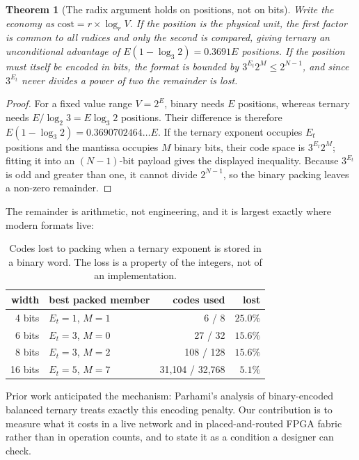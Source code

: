 \documentclass[11pt]{article}
\newtheorem{theorem}{Theorem}
\theoremstyle{definition}
\begin{document}
\begin{theorem}[The radix argument holds on positions, not on bits]
\label{thm:boundary}
Write the economy as $\text{cost} = r \times \log_r V$. If the position is the
physical unit, the first factor is common to all radices and only the second is
compared, giving ternary an unconditional advantage of $E(1-\log_3 2) = 0.3691E$
positions. If the position must itself be encoded in bits, the format is bounded
by $3^{E_t} 2^{M} \le 2^{N-1}$, and since $3^{E_t}$ never divides a power of two
the remainder is lost.
\end{theorem}
\begin{proof}
For a fixed value range $V=2^E$, binary needs $E$ positions, whereas ternary
needs $E/\log_2 3=E\log_3 2$ positions. Their difference is therefore
$E(1-\log_3 2)=0.3690702464\ldots E$. If the ternary exponent occupies
$E_t$ positions and the mantissa occupies $M$ binary bits, their code space is
$3^{E_t}2^M$; fitting it into an $(N-1)$-bit payload gives the displayed
inequality. Because $3^{E_t}$ is odd and greater than one, it cannot divide
$2^{N-1}$, so the binary packing leaves a non-zero remainder.
\end{proof}

The remainder is arithmetic, not engineering, and it is largest exactly where
modern formats live:

\begin{table}[t]\centering
\caption{Codes lost to packing when a ternary exponent is stored in a binary
word. The loss is a property of the integers, not of an implementation.}
\label{tab:packloss}
\begin{tabular}{rlrr}
\toprule
width & best packed member & codes used & lost \\
\midrule
4 bits & $E_t{=}1$, $M{=}1$ & 6 / 8 & $25.0\%$ \\
6 bits & $E_t{=}3$, $M{=}0$ & 27 / 32 & $15.6\%$ \\
8 bits & $E_t{=}3$, $M{=}2$ & 108 / 128 & $15.6\%$ \\
16 bits & $E_t{=}5$, $M{=}7$ & 31{,}104 / 32{,}768 & $5.1\%$ \\
\bottomrule
\end{tabular}
\end{table}

Prior work anticipated the mechanism: Parhami's analysis of binary-encoded
balanced ternary treats exactly this encoding penalty. Our contribution is to
measure what it costs in a live network and in placed-and-routed FPGA fabric rather
than in operation counts, and to state it as a condition a designer can check.
\end{document}
